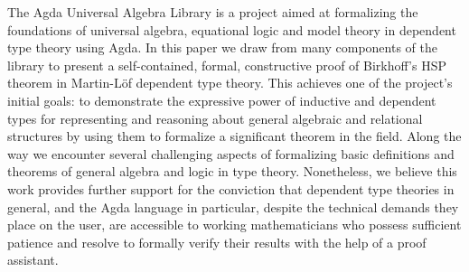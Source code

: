 The Agda Universal Algebra Library is a project aimed at formalizing the foundations of
universal algebra, equational logic and model theory in dependent type theory
using Agda. In this paper we draw from many components of the library to present
a self-contained, formal, constructive proof of Birkhoff's HSP theorem in
Martin-L\"of dependent type theory.
This achieves one of the project's initial goals: to demonstrate the expressive power of
inductive and dependent types for representing and reasoning about general
algebraic and relational structures by using them to formalize a significant theorem in the field.
\ifshort\else
Along the way we encounter several challenging aspects of formalizing basic
definitions and theorems of general algebra and logic in type theory. Nonetheless,
we believe this work provides further support for the conviction that dependent
type theories in general, and the Agda language in particular, despite the
technical demands they place on the user, are accessible to working
mathematicians who possess sufficient patience and resolve to formally verify
their results with the help of a proof assistant.
\fi